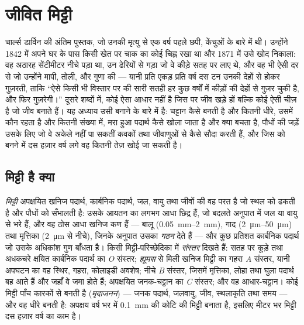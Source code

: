 \chapter{जीवित मिट्टी}\label{ch:b2:living-soil}

चार्ल्स डार्विन की अंतिम पुस्तक, जो उनकी मृत्यु से एक वर्ष पहले छपी,
केंचुओं के बारे में थी। उन्होंने 1842 में अपने घर के पास किसी खेत पर
चाक का कोई चिह्न रखा था और 1871 में उसे खोद निकाला: वह अठारह सेंटीमीटर
नीचे पड़ा था, उन ढेरियों से गड़ा जो वे कीड़े सतह पर लाए थे,
और वह भी ऐसी दर से जो उन्होंने मापी, तोली, और गुणा की --- यानी प्रति एकड़
प्रति वर्ष दस टन  उनकी देहों से होकर गुज़रती, ताकि
``ऐसे किसी भी विस्तार पर की सारी सतही  हर कुछ वर्षों में
कीड़ों की देहों से गुज़र चुकी है, और फिर गुज़रेगी।''
दूसरे शब्दों में,  कोई ऐसा आधार नहीं है जिस पर जीव
खड़े हों बल्कि कोई ऐसी चीज़ है जो जीव बनाते हैं। यह अध्याय
उसी बनाने के बारे में है: चट्टान  कैसे बनती है और कितनी धीरे, उसमें कौन
रहता है और कितनी संख्या में, मरा हुआ पदार्थ कैसे खोला जाता है और
क्या बचता है, पौधों की जड़ें उसके लिए जो वे अकेले नहीं पा सकतीं कवकों तथा
जीवाणुओं से कैसे सौदा करती हैं, और जिस  को बनने में
दस हज़ार वर्ष लगे वह कितनी तेज़ खोई जा सकती है।

\section{मिट्टी है क्या}

\begin{definition}[मिट्टी और उसके संस्तर]\label{def:b2:living-soil:soil}
\emph{मिट्टी} अपक्षयित खनिज पदार्थ, कार्बनिक
पदार्थ, जल, वायु तथा जीवों की वह परत है जो स्थल को ढकती है और
पौधों को सँभालती है: उसके आयतन का लगभग आधा छिद्र हैं, जो बदलते अनुपात में
जल या वायु से भरे हैं, और वह ठोस आधा खनिज कण हैं ---
बालू (\qtyrange{0.05}{2}{mm}), गाद (\qtyrange{2}{50}{\micro m}) तथा
मृत्तिका (\qty{2}{\micro m} से नीचे), जिनके अनुपात उसका
\emph{गठन} देते हैं --- और कुछ प्रतिशत कार्बनिक पदार्थ जो
उसके अधिकांश गुण बाँधता है। किसी मिट्टी-परिच्छेदिका में
\emph{संस्तर} दिखते हैं: सतह पर कूड़े तथा अधकचरे क्षयित
कार्बनिक पदार्थ का \emph{O} संस्तर; \emph{ह्यूमस} से मिली खनिज
मिट्टी का गहरा \emph{A} संस्तर, यानी अपघटन का वह स्थिर, गहरा, कोलाइडी अवशेष;
नीचे \emph{B} संस्तर, जिसमें मृत्तिका,
लोहा तथा घुला पदार्थ बह आते हैं और जहाँ वे जमा होते हैं;
अपक्षयित जनक-चट्टान का \emph{C} संस्तर; और वह आधार-चट्टान। कोई
मिट्टी पाँच कारकों से बनती है (\emph{मृदाजनन}) --- जनक
पदार्थ, जलवायु, जीव, स्थलाकृति तथा समय --- और वह
धीरे बनती है: अपक्षय वर्ष भर में \qty{0.1}{mm} की कोटि की
मिट्टी बनाता है, इसलिए मीटर भर मिट्टी दस हज़ार वर्ष का काम है।
\end{definition}

